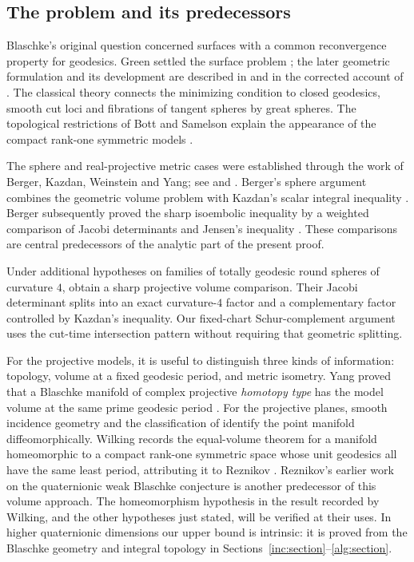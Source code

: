 \subsection{The problem and its predecessors}

Blaschke's original question concerned surfaces with a common
reconvergence property for geodesics. Green settled the surface
problem \citep{Blaschke1921,Green1963}; the later geometric formulation
and its development are described in \citet{Besse1978} and in the
corrected account of \citet{McKay2016}. The classical theory connects
the minimizing condition to closed geodesics, smooth cut loci and
fibrations of tangent spheres by great spheres. The topological
restrictions of Bott and Samelson explain the appearance of the
compact rank-one symmetric models
\citep[Theorem~7.2]{Besse1978}.

The sphere and real-projective metric cases were established through
the work of Berger, Kazdan, Weinstein and Yang; see
\citet[Appendices~D--E]{Besse1978} and
\citet[Sections~11--12]{McKay2016}. Berger's sphere argument combines
the geometric volume problem with Kazdan's scalar integral inequality
\citep{Berger1978AppendixD,Kazdan1978AppendixE}. Berger subsequently
proved the sharp isoembolic inequality by a weighted comparison of
Jacobi determinants and Jensen's inequality
\citep[pp.~263--264]{Berger1980}. These comparisons are central
predecessors of the analytic part of the present proof.

Under additional hypotheses on families of totally geodesic round
spheres of curvature $4$, \citet[Theorem~26, pp.~8--11]
{RovenskiiToponogov1996} obtain a sharp projective volume comparison.
Their Jacobi determinant splits into an exact curvature-$4$ factor
and a complementary factor controlled by Kazdan's inequality.
Our fixed-chart Schur-complement argument uses the cut-time
intersection pattern without requiring that geometric splitting.

For the projective models, it is useful to distinguish three kinds
of information: topology, volume at a fixed geodesic period, and
metric isometry. Yang proved that a Blaschke manifold of complex
projective \emph{homotopy type} has the model volume at the same
prime geodesic period \citep[Theorem, p.~380]{Yang1991}. For the
projective planes, smooth incidence geometry and the classification
of \citet[Corollary~C]{KramerStolz2007} identify the point manifold
diffeomorphically. Wilking records the equal-volume theorem for
a manifold homeomorphic to a compact rank-one symmetric space whose
unit geodesics all have the same least period, attributing it to
Reznikov \citep[p.~282]{Wilking2001}. Reznikov's earlier work
on the quaternionic weak Blaschke conjecture
\citep{Reznikov1985HP} is another predecessor of this volume
approach. The homeomorphism hypothesis in the result recorded
by Wilking, and the other hypotheses just stated, will be
verified at their uses. In higher quaternionic dimensions our upper
bound is intrinsic: it is proved from the Blaschke geometry and
integral topology in Sections~\ref{inc:section}--\ref{alg:section}.

